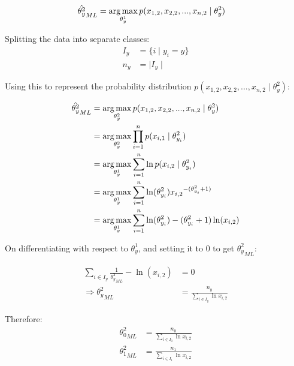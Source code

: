 \documentclass[openany,11pt]{homework}
\begin{document}
\begin{align}
\hat{\theta_y^{2}}_{ML} & = \operatornamewithlimits{arg\,max}_{\theta_y^{1}} p(x_{1,2}, x_{2,2}, ..., x_{n, 2} \mid \theta_y^{2})
\end{align}

Splitting the data into separate classes: \\
\begin{align}
I_y & = \{i \mid y_i = y\} \\
n_y & = \mid I_y \mid
\end{align}

Using this to represent the probability distribution $p(x_{1,2}, x_{2,2}, ..., x_{n, 2} \mid \theta_y^{2})$:

\begin{align}
\hat{\theta_y^{2}}_{ML} & = \operatornamewithlimits{arg\,max}_{\theta_y^{2}} p(x_{1,2}, x_{2,2}, ..., x_{n, 2} \mid \theta_y^{2}) \\
                        & = \operatornamewithlimits{arg\,max}_{\theta_y^{2}} \prod_{i=1}^{n} p(x_{i,1} \mid \theta_{y_i}^{2}) \\
                        & = \operatornamewithlimits{arg\,max}_{\theta_y^{1}} \sum_{i=1}^{n} \ln p(x_{i,2} \mid \theta_{y_i}^{2}) \\
                        & = \operatornamewithlimits{arg\,max}_{\theta_y^{1}} \sum_{i=1}^{n} \ln (\theta_{y_i}^{2}){x_{i,2}}^{-(\theta_{y_i}^{2} + 1)} \\
                        & = \operatornamewithlimits{arg\,max}_{\theta_y^{1}} \sum_{i=1}^{n} \ln (\theta_{y_i}^{2}) - (\theta_{y_i}^{2} + 1) \ln (x_{i,2})
\end{align}

On differentiating with respect to $\theta_{y}^{1}$, and setting it to 0 to get ${\theta_{y}^{2}}_{ML}$:

\begin{align}
\sum_{i \in I_y} \frac{1}{{\theta_{y}^{2}}_{ML}} - {\ln (x_{i,2})} & = 0 \\
\Rightarrow {\theta_{y}^{2}}_{ML} & = \frac{n_y}{\sum_{i \in I_y} \ln x_{i,2}}
\end{align}

Therefore:
\begin{align}
{\theta_{0}^{2}}_{ML} & = \frac{n_0}{\sum_{i \in I_0} \ln x_{i,2}}\\
{\theta_{1}^{2}}_{ML} & = \frac{n_1}{\sum_{i \in I_1} \ln x_{i,2}}
\end{align}
\end{document}
